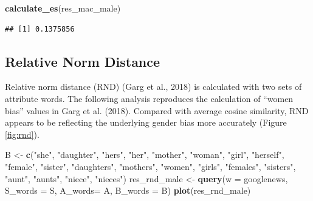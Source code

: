\documentclass[english,man]{apa6}
\newenvironment{Shaded}{\begin{snugshade}}{\end{snugshade}}
\newcommand{\DataTypeTok}[1]{\textcolor[rgb]{0.13,0.29,0.53}{#1}}
\newcommand{\KeywordTok}[1]{\textcolor[rgb]{0.13,0.29,0.53}{\textbf{#1}}}
\newcommand{\NormalTok}[1]{#1}
\newcommand{\StringTok}[1]{\textcolor[rgb]{0.31,0.60,0.02}{#1}}
\begin{document}
\begin{Shaded}
\begin{Highlighting}[]
\KeywordTok{calculate_es}\NormalTok{(res_mac_male)}
\end{Highlighting}
\end{Shaded}

\begin{verbatim}
## [1] 0.1375856
\end{verbatim}

\hypertarget{relative-norm-distance}{%
\subsection{Relative Norm Distance}\label{relative-norm-distance}}

Relative norm distance (RND) (Garg et al., 2018) is calculated with two sets of attribute words. The following analysis reproduces the calculation of \enquote{women bias} values in Garg et al. (2018). Compared with average cosine similarity, RND appears to be reflecting the underlying gender bias more accurately (Figure \ref{fig:rnd}).

\begin{Shaded}
\begin{Highlighting}[]
\NormalTok{B <-}\StringTok{ }\KeywordTok{c}\NormalTok{(}\StringTok{"she"}\NormalTok{, }\StringTok{"daughter"}\NormalTok{, }\StringTok{"hers"}\NormalTok{, }\StringTok{"her"}\NormalTok{, }\StringTok{"mother"}\NormalTok{, }\StringTok{"woman"}\NormalTok{, }\StringTok{"girl"}\NormalTok{,}
       \StringTok{"herself"}\NormalTok{, }\StringTok{"female"}\NormalTok{, }\StringTok{"sister"}\NormalTok{, }\StringTok{"daughters"}\NormalTok{, }\StringTok{"mothers"}\NormalTok{, }\StringTok{"women"}\NormalTok{,}
       \StringTok{"girls"}\NormalTok{, }\StringTok{"females"}\NormalTok{, }\StringTok{"sisters"}\NormalTok{, }\StringTok{"aunt"}\NormalTok{, }\StringTok{"aunts"}\NormalTok{, }\StringTok{"niece"}\NormalTok{, }\StringTok{"nieces"}\NormalTok{)}
\NormalTok{res_rnd_male <-}\StringTok{ }\KeywordTok{query}\NormalTok{(}\DataTypeTok{w =}\NormalTok{ googlenews, }\DataTypeTok{S_words =}\NormalTok{ S, }\DataTypeTok{A_words=}\NormalTok{ A, }\DataTypeTok{B_words =}\NormalTok{ B)}
\KeywordTok{plot}\NormalTok{(res_rnd_male)}
\end{Highlighting}
\end{Shaded}
\end{document}

